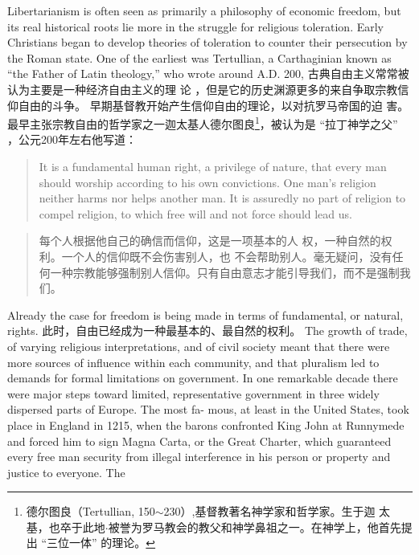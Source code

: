 \begin{paracol}{2}
Libertarianism is often seen as primarily a philosophy of economic freedom, but its real historical roots lie more in the struggle for religious toleration. Early Christians began to develop
theories of toleration to counter their persecution by the Roman
state. One of the earliest was Tertullian, a Carthaginian known
as ``the Father of Latin theology,'' who wrote around A.D. 200,
\switchcolumn
古典自由主义常常被认为主要是一种经济自由主义的理
论 ，但是它的历史渊源更多的来自争取宗教信仰自由的斗争。
早期基督教开始产生信仰自由的理论，以对抗罗马帝国的迫
害。最早主张宗教自由的哲学家之一迦太基人德尔图良\footnote{德尔图良（Tertullian, 150$\sim$230）,基督教著名神学家和哲学家。生于迦	太基，也卒于此地$\cdot$被誉为罗马教会的教父和神学鼻祖之一。在神学上，他首先提出 “三位一体” 的理论。}，被认为是 “拉丁神学之父” ，公元200年左右他写道：
\switchcolumn*
\begin{quote}
	It is a fundamental human right, a privilege of nature, that every
	man should worship according to his own convictions. One
	man's religion neither harms nor helps another man. It is assuredly no part of religion to compel religion, to which free will
	and not force should lead us.
\end{quote}
\switchcolumn
\begin{quote}
	每个人根据他自己的确信而信仰，这是一项基本的人
	权，一种自然的权利。一个人的信仰既不会伤害别人，也
	不会帮助别人。毫无疑问，没有任何一种宗教能够强制别人信仰。只有自由意志才能引导我们，而不是强制我们。
\end{quote}
\switchcolumn*
Already the case for freedom is being made in terms of fundamental, or natural, rights.
\switchcolumn
此时，自由已经成为一种最基本的、最自然的权利。
\switchcolumn*
The growth of trade, of varying religious interpretations, and
of civil society meant that there were more sources of influence
within each community, and that pluralism led to demands for
formal limitations on government. In one remarkable decade
there were major steps toward limited, representative government in three widely dispersed parts of Europe. The most fa-
mous, at least in the United States, took place in England in
1215, when the barons confronted King John at Runnymede
and forced him to sign Magna Carta, or the Great Charter,
which guaranteed every free man security from illegal interference in his person or property and justice to everyone. The

\end{paracol}
